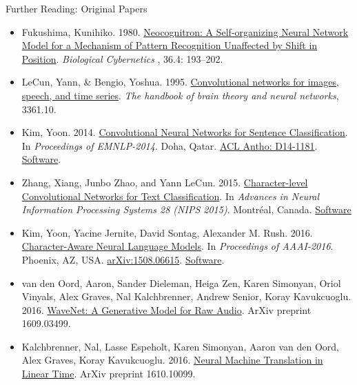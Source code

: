 \documentclass[xcolor=pdftex,x11names,table,hyperref]{beamer}
\newcommand{\Conv}{Convolutional}
\begin{document}
\begin{frame}{Further Reading: Original Papers}
\begin{tiny}
\begin{itemize}
	\item Fukushima, Kunihiko. 1980. \href{http://www.cs.princeton.edu/courses/archive/spr08/cos598B/Readings/Fukushima1980.pdf}{Neocognitron: A Self-organizing Neural Network Model for a Mechanism of Pattern Recognition Unaffected by Shift in Position}. \textit{Biological Cybernetics }, 36.4: 193--202.
	\item LeCun, Yann, \& Bengio, Yoshua. 1995. \href{http://www.iro.umontreal.ca/~lisa/pointeurs/handbook-convo.pdf}{\Conv{} networks for images, speech, and time series}. \textit{The handbook of brain theory and neural networks}, 3361.10.
	\item Kim, Yoon. 2014. \href{https://www.aclweb.org/anthology/D14-1181.pdf}{Convolutional Neural Networks for Sentence Classification}.  In \textit{Proceedings of EMNLP-2014}. Doha, Qatar. \href{https://www.aclweb.org/anthology/D14-1181.pdf}{ACL Antho: D14-1181}. \href{https://github.com/yoonkim/CNN_sentence}{Software}.
	\item Zhang, Xiang, Junbo Zhao, and Yann LeCun. 2015. \href{https://papers.nips.cc/paper/5782-character-level-convolutional-networks-for-text-classification}{Character-level Convolutional Networks for Text Classification}. In \textit{Advances in Neural Information Processing Systems 28 (NIPS 2015)}. Montr\'{e}al, Canada. \href{https://github.com/zhangxiangxiao/Crepe}{Software}
	\item Kim, Yoon, Yacine Jernite, David Sontag, Alexander M. Rush. 2016. \href{http://arxiv.org/abs/1508.06615}{Character-Aware Neural Language Models}.  In \textit{Proceedings of AAAI-2016}. Phoenix, AZ, USA. \href{http://arxiv.org/abs/1508.06615}{arXiv:1508.06615}. \href{https://github.com/yoonkim/lstm-char-cnn}{Software}.
	\item van den Oord, Aaron, Sander Dieleman, Heiga Zen, Karen Simonyan, Oriol Vinyals, Alex Graves, Nal Kalchbrenner, Andrew Senior, Koray Kavukcuoglu. 2016. \href{https://arxiv.org/abs/1609.03499}{WaveNet: A Generative Model for Raw Audio}.  ArXiv preprint 1609.03499.
	\item Kalchbrenner, Nal, Lasse Espeholt, Karen Simonyan, Aaron van den Oord, Alex Graves, Koray Kavukcuoglu. 2016. \href{https://arxiv.org/abs/1610.10099}{Neural Machine Translation in Linear Time}.  ArXiv preprint 1610.10099.
\end{itemize}
\end{tiny}
\end{frame}





\end{document}
